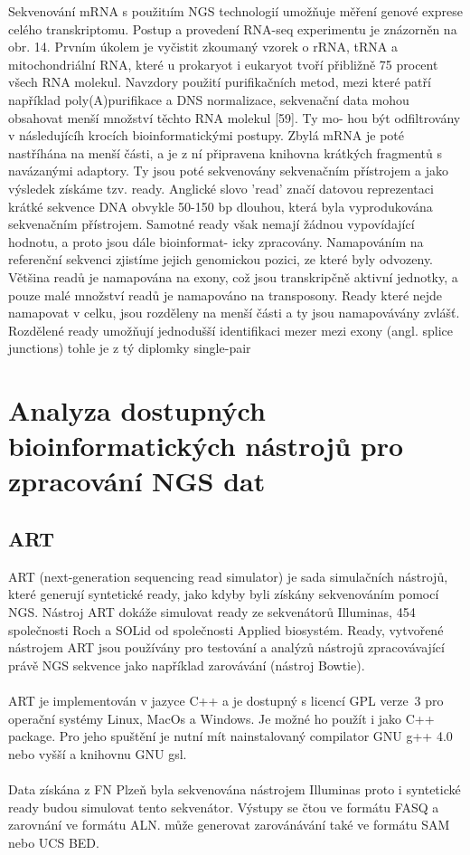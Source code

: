 \documentclass[czech,DP]{thesiskiv}
\begin{document}
Sekvenování mRNA s použitıím NGS technologií umožňuje měření genové exprese celého
transkriptomu. Postup a provedení RNA-seq experimentu je znázorněn na obr. 14.
Prvním úkolem je vyčistit zkoumaný vzorek o rRNA, tRNA a mitochondriální RNA,
které u prokaryot i eukaryot tvoří přibližně 75 procent všech RNA molekul. Navzdory použití
purifikačních metod, mezi které patří například poly(A)purifikace a DNS normalizace,
sekvenační data mohou obsahovat menší množství těchto RNA molekul [59]. Ty mo-
hou být odfiltrovány v následujícíh krocích bioinformatickými postupy. Zbylá mRNA
je poté nastříhána na menší části, a je z ní připravena knihovna krátkých fragmentů s
navázanými adaptory. Ty jsou poté sekvenovány sekvenačním přístrojem a jako výsledek
získáme tzv. ready. Anglické slovo ’read’ značí datovou reprezentaci krátké sekvence
DNA obvykle 50-150 bp dlouhou, která byla vyprodukována sekvenačním přístrojem.
Samotné ready však nemají žádnou vypovídající hodnotu, a proto jsou dále bioinformat-
icky zpracovány. Namapováním na referenční sekvenci zjistíme jejich genomickou pozici,
ze které byly odvozeny. Většina readů je namapována na exony, což jsou transkripčně
aktivní jednotky, a pouze malé množství readů je namapováno na transposony. Ready
které nejde namapovat v celku, jsou rozděleny na menší části a ty jsou namapovávány
zvlášť. Rozdělené ready umožňují jednodušší identifikaci mezer mezi exony (angl. splice
junctions)
tohle je z tý diplomky single-pair

\chapter{Analyza dostupných bioinformatických nástrojů pro zpracování NGS dat}

\section{ART}
ART (next-generation sequencing read simulator) je sada simulačních nástrojů, které generují syntetické ready, jako kdyby byli získány sekvenováním pomocí NGS. Nástroj ART dokáže simulovat ready ze sekvenátorů Illuminas, 454 společnosti Roch a SOLid od společnosti Applied biosystém. Ready, vytvořené nástrojem ART jsou používány pro testování a analýzů nástrojů zpracovávající právě NGS sekvence jako například zarovávání (nástroj Bowtie). 
\\
\\
ART je implementován v jazyce C++ a je dostupný s licencí GPL verze~3 pro operační systémy Linux, MacOs a Windows. Je možné ho použít i jako C++ package. Pro jeho spuštění je nutní mít nainstalovaný compilator GNU g++ 4.0 nebo vyšší a knihovnu GNU gsl. 
\\
\\
Data získána z FN Plzeň byla sekvenována nástrojem Illuminas proto i syntetické ready budou simulovat tento sekvenátor.    
 Výstupy se čtou ve formátu FASQ a zarovnání ve formátu ALN. může generovat zarovánávání také ve formátu SAM nebo UCS BED. \cite{art}
\end{document}
